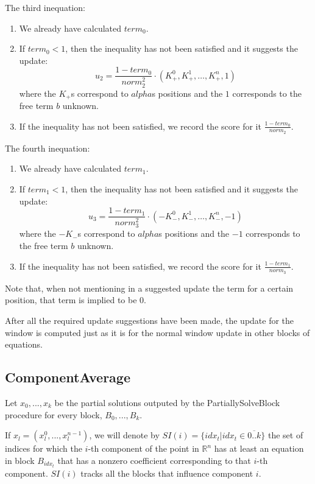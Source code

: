 \documentclass[a4paper,twoside,10pt]{report}
\begin{document}
		
	The third inequation: 
	\begin{enumerate}
		\item We already have calculated \(term_0\).
		\item If \(term_0 < 1\), then the inequality has not been satisfied and it suggests the update:
		\[
		 u_2 = \frac{1 - term_0}{norm_2^2}\cdot(K_+^0, K_+^1, \ldots, K_+^n, 1)
		\]
		where the \(K_+\)s correspond to \(alpha\)s positions and the \(1\) corresponds to the free term \(b\) unknown.
		\item If the inequality has not been satisfied, we record the score for it \(\frac{1 - term_0}{norm_2}\).
	\end{enumerate}
	
	The fourth inequation:
	\begin{enumerate}
		\item We already have calculated \(term_1\).
		\item If \(term_1 < 1\), then the inequality has not been satisfied and it suggests the update:
		\[
		 u_3 = \frac{1 - term_1}{norm_3^2}\cdot(-K_-^0, K_-^1, \ldots, K_-^n, -1)
		\]
		where the \(-K_-\)s correspond to \(alpha\)s positions and the \(-1\) corresponds to the free term \(b\) unknown.
		\item If the inequality has not been satisfied, we record the score for it \(\frac{1 - term_1}{norm_3}\).
	\end{enumerate}	
	
	Note that, when not mentioning in a suggested update the term for a certain position, that term is implied to be 0.
	
	After all the required update suggestions have been made, the update for the window is computed just as it is for the normal window update in other blocks of equations.
	
	\clearpage	
	
	
		
	\subsection{ComponentAverage}
	
		Let \(x_0, ..., x_k\) be the partial solutions outputed by the PartiallySolveBlock procedure for every block, \(B_0, ..., B_k\). 

		If \(x_l = (x^0_l, ..., x^{n-1}_l)\), we will denote by \(SI(i) = \{idx_t| idx_t \in\overline{0..k}\}\) the set of indices for which the \(i\)-th component of the 
point in \(\mathbb{R} ^n\) has at least an equation in block \(B_{idx_t}\) that has a nonzero coefficient corresponding to that \(i\)-th component. \(SI(i)\) tracks all the 
blocks that influence component \(i\).
\end{document}
